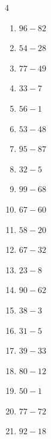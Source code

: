 \begin{multicols}{4}
\begin{enumerate}
  \item $96-82$
        \phantom{$=14$}

  \item $54-28$
        \phantom{$=26$}

\columnbreak %

\resetques

  \item $77-49$
        \phantom{$=28$}

  \item $33-7$
        \phantom{$=26$}

  \item $56-1$
        \phantom{$=55$}

  \item $53-48$
        \phantom{$=5$}

  \item $95-87$
        \phantom{$=8$}

  \item $32-5$
        \phantom{$=27$}

  \item $99-68$
        \phantom{$=31$}

  \item $67-60$
        \phantom{$=7$}

  \item $58-20$
        \phantom{$=38$}

  \item $67-32$
        \phantom{$=35$}

  \item $23-8$
        \phantom{$=15$}

  \item $90-62$
        \phantom{$=28$}

  \item $38-3$
        \phantom{$=35$}

  \item $31-5$
        \phantom{$=26$}

  \item $39-33$
        \phantom{$=6$}

  \item $80-12$
        \phantom{$=68$}

  \item $50-1$
        \phantom{$=49$}

  \item $77-72$
        \phantom{$=5$}

  \item $92-18$
        \phantom{$=74$}


\end{enumerate}
\end{multicols}
